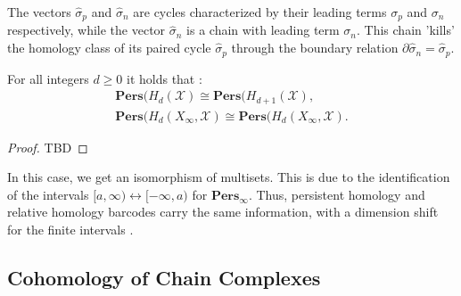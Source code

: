 The vectors $\hat{\sigma}_{p}$ and $\hat{\sigma}_{n}$ are cycles characterized by
their leading terms $\sigma_{p}$ and $\sigma_{n}$ respectively, while the vector
$\hat{\sigma}_{n}$ is a chain with leading term $\sigma_{n}$. This chain 'kills'
the homology class of its paired cycle $\hat{\sigma}_{p}$ through the boundary relation
$\partial \hat{\sigma}_{n} = \hat{\sigma}_{p}$.

\begin{theorem}
	For all integers $d \geq 0$ it holds that \cite[\S 2.4]{de2011dualities}:
	\begin{align*}
		\textbf{Pers}(H_{d}(\mathcal{X}) \cong \textbf{Pers}(H_{d+1}(\mathcal{X}),                       \\
		\textbf{Pers}(H_{d}(X_{\infty}, \mathcal{X}) \cong \textbf{Pers}(H_{d}(X_{\infty}, \mathcal{X}).
	\end{align*}
\end{theorem}

\begin{proof}
TBD
\end{proof}

\begin{remark}
	In this case, we get an isomorphism of multisets. This is due to the identification
	of the intervals $[a,\infty) \leftrightarrow [-\infty, a)$ for $\textbf{Pers}_{\infty}$.
	Thus, persistent homology and relative homology barcodes carry the same information,
	with a dimension shift for the finite intervals \cite[\S 2.4]{de2011dualities}.
\end{remark}

\subsection{Cohomology of Chain Complexes}

